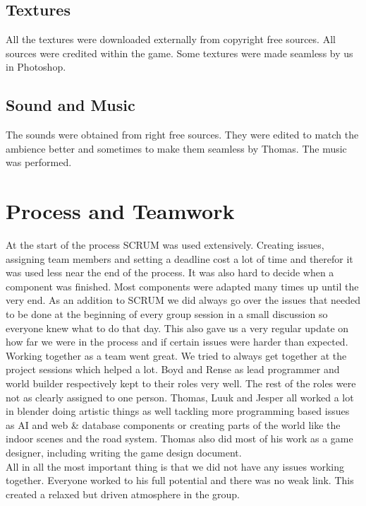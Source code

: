 \documentclass{article}
\begin{document}
\subsection{Textures}
All the textures were downloaded externally from copyright free sources. All sources were credited within the game. Some textures were made seamless by us in Photoshop.

\subsection{Sound and Music}
The sounds were obtained from right free sources. They were edited to match the ambience better and sometimes to make them seamless by Thomas. The music was performed.


\newpage
\section{Process and Teamwork}
At the start of the process SCRUM was used extensively. Creating issues, assigning team members and setting a deadline cost a lot of time and therefor it was used less near the end of the process. It was also hard to decide when a component was finished. Most components were adapted many times up until the very end. As an addition to SCRUM we did always go over the issues that needed to be done at the beginning of every group session in a small discussion so everyone knew what to do that day. This also gave us a very regular update on how far we were in the process and if certain issues were harder than expected.\\

Working together as a team went great. We tried to always get together at the project sessions which helped a lot. Boyd and Rense as lead programmer and world builder respectively kept to their roles very well. The rest of the roles were not as clearly assigned to one person. Thomas, Luuk and Jesper all worked a lot in blender doing artistic things as well tackling more programming based issues as AI and web \& database components or creating parts of the world like the indoor scenes and the road system. Thomas also did most of his work as a game designer, including writing the game design document.\\

All in all the most important thing is that we did not have any issues working together. Everyone worked to his full potential and there was no weak link. This created a relaxed but driven atmosphere in the group.
\end{document}
